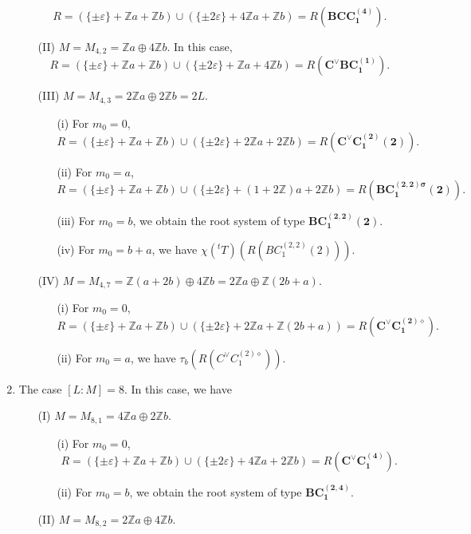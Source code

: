 \documentclass[11pt]{amsart}
\newcommand{\Z}{\mathbb{Z}}
\newcommand{\vep}{\varepsilon}
\begin{document}
\begin{enumerate}
\begin{enumerate}
\[ R=(\{ \pm\vep \}+\Z a+\Z b) \cup (\{ \pm 2\vep \}+4\Z a+\Z b) =R(\mathbf{BCC_1^{(4)}}).
\]
\item[(II)] $M=M_{4,2}=\Z a \oplus 4\Z b$. In this case,  
\[ R=(\{ \pm\vep \}+\Z a+\Z b) \cup (\{ \pm 2\vep \}+\Z a+4\Z b) =R(\mathbf{C^\vee BC_1^{(1)}}).\]
\item[(III)] $M=M_{4,3}=2\Z a \oplus 2\Z b=2L$.
\begin{enumerate}
\item[(i)] For $m_0=0$, 
\[ R=(\{ \pm\vep \}+\Z a+\Z b) \cup (\{ \pm 2\vep \}+2\Z a+2\Z b) =R(\mathbf{C^\vee C_1^{(2)}(2)}).
\]
\item[(ii)] For $m_0=a$,  
\[ R=(\{ \pm\vep \}+\Z a+\Z b) \cup (\{ \pm 2\vep \}+(1+2\Z) a+2\Z b) 
=R(\mathbf{BC_1^{(2,2)\sigma}(2)}).
\]
\item[(iii)] For $m_0=b$, we obtain the root system of type
$\mathbf{BC_1^{(2,2)}(2)}$.
\item[(iv)] For $m_0=b+a$, we have
$\chi({}^tT)(R(BC_1^{(2,2)}(2)))$. 
\end{enumerate}
\item[(IV)] $M=M_{4,7}=\Z(a+2b) \oplus 4\Z b=2\Z a \oplus \Z(2b+a) $. 
\begin{enumerate}
\item[(i)] For $m_0=0$, 
\[ R=(\{ \pm\vep \}+\Z a+\Z b) \cup (\{ \pm 2\vep \}+2\Z a+\Z (2b+a)) 
=R(\mathbf{C^\vee C_1^{(2)\diamond}}).
\]
\item[(ii)] For $m_0=a$, we have 
$\tau_b(R(C^\vee C_1^{(2)\diamond}))$.
\end{enumerate}
\end{enumerate}
\item The case $[L:M]=8$.
In this case, we have
\begin{enumerate}
\item[(I)] $M=M_{8,1}=4\Z a\oplus 2\Z b$.
\begin{enumerate}
\item[(i)] For $m_0=0$,  
\[ R=(\{ \pm\vep \}+\Z a+\Z b) \cup (\{ \pm 2\vep \}+4\Z a+2\Z b) =R(\mathbf{C^\vee C_1^{(4)}}).
\]
\item[(ii)] For $m_0=b$, we obtain the root system of type $\mathbf{BC_1^{(2,4)}}$.
\end{enumerate}
\item[(II)] $M=M_{8,2}=2\Z a \oplus 4\Z b$.

\end{enumerate}
\end{enumerate}
\end{document}
